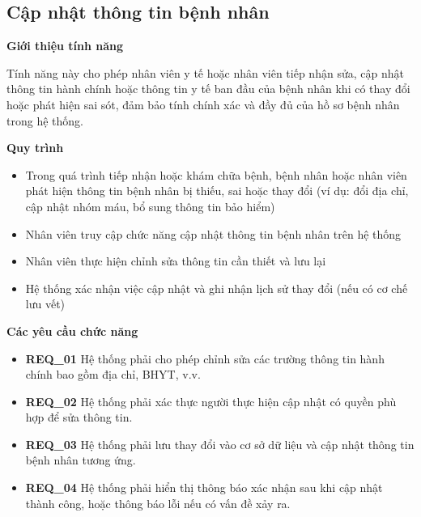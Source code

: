 \subsection{Cập nhật thông tin bệnh nhân}

\noindent \textbf{Giới thiệu tính năng}

Tính năng này cho phép nhân viên y tế hoặc nhân viên tiếp nhận sửa, cập nhật thông tin hành chính hoặc thông tin y tế ban đầu của bệnh nhân khi có thay đổi hoặc phát hiện sai sót, đảm bảo tính chính xác và đầy đủ của hồ sơ bệnh nhân trong hệ thống.

\noindent \textbf{Quy trình}

\begin{itemize}

  \item Trong quá trình tiếp nhận hoặc khám chữa bệnh, bệnh nhân hoặc nhân viên phát hiện thông tin bệnh nhân bị thiếu, sai hoặc thay đổi (ví dụ: đổi địa chỉ, cập nhật nhóm máu, bổ sung thông tin bảo hiểm)

  \item Nhân viên truy cập chức năng cập nhật thông tin bệnh nhân trên hệ thống

  \item Nhân viên thực hiện chỉnh sửa thông tin cần thiết và lưu lại

  \item Hệ thống xác nhận việc cập nhật và ghi nhận lịch sử thay đổi (nếu có cơ chế lưu vết)

\end{itemize}

\noindent \textbf{Các yêu cầu chức năng}

\begin{itemize}

  \item \textbf{REQ\_01} Hệ thống phải cho phép chỉnh sửa các trường thông tin hành chính bao gồm địa chỉ, BHYT, v.v.

  \item \textbf{REQ\_02} Hệ thống phải xác thực người thực hiện cập nhật có quyền phù hợp để sửa thông tin.

  \item \textbf{REQ\_03} Hệ thống phải lưu thay đổi vào cơ sở dữ liệu và cập nhật thông tin bệnh nhân tương ứng.

  \item \textbf{REQ\_04} Hệ thống phải hiển thị thông báo xác nhận sau khi cập nhật thành công, hoặc thông báo lỗi nếu có vấn đề xảy ra.

\end{itemize}

